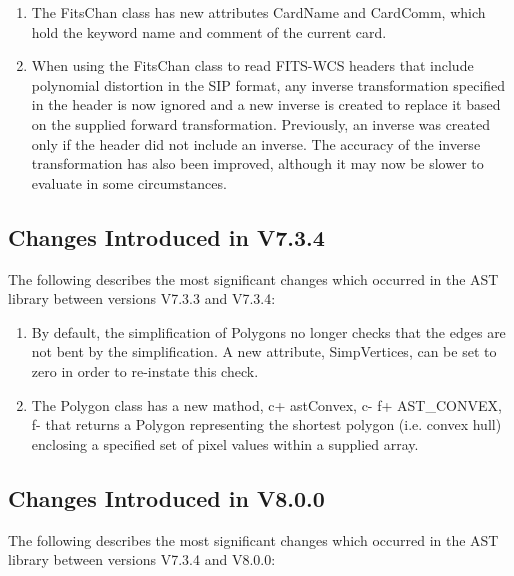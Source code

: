 \documentclass[twoside,11pt]{starlink}
\begin{document}
\begin{enumerate}

\item The FitsChan class has new attributes CardName and CardComm, which hold
the keyword name and comment of the current card.

\item When using the FitsChan class to read FITS-WCS headers that include
polynomial distortion in the SIP format, any inverse transformation specified
in the header is now ignored and a new inverse is created to replace it based
on the supplied forward transformation. Previously, an inverse was created
only if the header did not include an inverse. The accuracy of the inverse
transformation has also been improved, although it may now be slower to
evaluate in some circumstances.

\end{enumerate}

\subsection{Changes Introduced in V7.3.4}

The following describes the most significant changes which
occurred in the AST library between versions V7.3.3 and V7.3.4:

\begin{enumerate}

\item By default, the simplification of Polygons no longer checks that the
edges are not bent by the simplification. A new attribute, SimpVertices,
can be set to zero in order to re-instate this check.

\item The Polygon class has a new mathod,
c+
astConvex,
c-
f+
AST\_CONVEX,
f-
that returns a Polygon representing the shortest polygon (i.e. convex
hull) enclosing a specified set of pixel values within a supplied array.

\end{enumerate}

\subsection{Changes Introduced in V8.0.0}

The following describes the most significant changes which
occurred in the AST library between versions V7.3.4 and V8.0.0:
\end{document}
